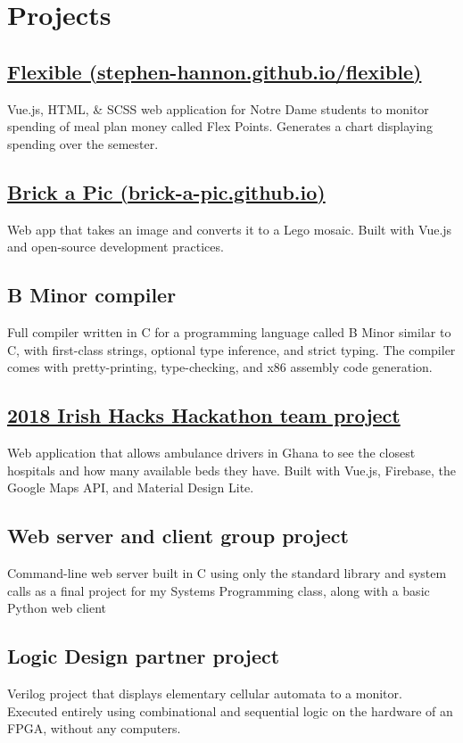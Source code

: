 \documentclass[letterpaper]{article}
\begin{document}
\begin{minipage}[t]{\dimexpr.67\textwidth-.5\columnsep}
\section{Projects}

\subsection{\href{https://stephen-hannon.github.io/flexible/}{Flexible (stephen-hannon.github.io/flexible)}}
Vue.js, HTML, \& SCSS web application for Notre Dame students to monitor spending of meal plan money called Flex Points. Generates a chart displaying spending over the semester.

\subsection{\href{https://brick-a-pic.github.io/brick-a-pic}{Brick a Pic (brick-a-pic.github.io)}}
Web app that takes an image and converts it to a Lego mosaic. Built with Vue.js and open-source development practices.

\subsection{B Minor compiler}
Full compiler written in C for a programming language called B Minor similar to C, with first-class strings, optional type inference, and strict typing. The compiler comes with pretty-printing, type-checking, and x86 assembly code generation.

\subsection{\href{https://github.com/GhanaNeedAnAmbulance/WebDev}{2018 Irish Hacks Hackathon team project}}
Web application that allows ambulance drivers in Ghana to see the closest hospitals and how many available beds they have. Built with Vue.js, Firebase, the Google Maps API, and Material Design Lite.

\subsection{Web server and client group project}
Command-line web server built in C using only the standard library and system calls as a final project for my Systems Programming class, along with a basic Python web client

\subsection{Logic Design partner project}
Verilog project that displays elementary cellular automata to a monitor. Executed entirely using combinational and sequential logic on the hardware of an FPGA, without any computers.


\end{minipage}
\end{document}
